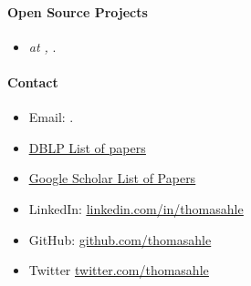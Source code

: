\documentclass[11pt]{article}
\begin{document}
\paragraph{Open Source Projects}
\begin{itemize}
   \item[]
   \emph{ at , }.
   \\
\end{itemize}



\paragraph{Contact}
\begin{itemize}
   \item[]
      Email: \href{mailto:\VAR{authors['thdy'].email}}{}.
   \item[]
      \href{https://dblp1.uni-trier.de/pers/hd/a/Ahle:Thomas_D=}{\underline{DBLP List of papers}}
   \item[]
      \href{https://scholar.google.dk/citations?user=aRiVoYgAAAAJ}{\underline{Google Scholar List of Papers}}
   \item[]
      LinkedIn: \href{https://www.linkedin.com/in/thomasahle/}{\underline{linkedin.com/in/thomasahle}}
   \item[]
      GitHub: \href{https://github.com/thomasahle}{\underline{github.com/thomasahle}}
   \item[]
      Twitter \href{https://twitter.com/thomasahle}{\underline{twitter.com/thomasahle}}
\end{itemize}
\end{document}
